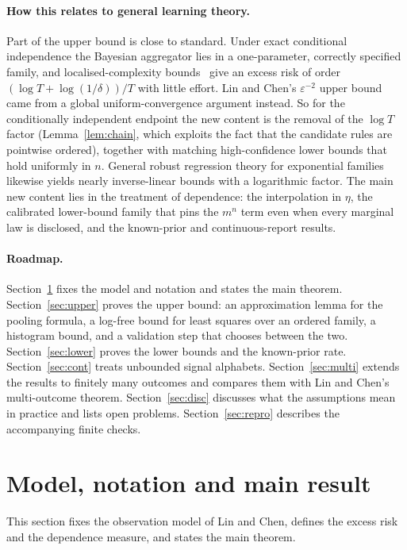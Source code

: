 \documentclass[11pt,a4paper]{article}
\theoremstyle{remark}
\newcommand{\eps}{\varepsilon}
\begin{document}
\paragraph{How this relates to general learning theory.}
Part of the upper bound is close to standard. Under exact conditional independence the Bayesian aggregator lies in a one-parameter, correctly specified family, and localised-complexity bounds~\cite{bbm,kol} give an excess risk of order $(\log T+\log(1/\delta))/T$ with little effort. Lin and Chen's $\eps^{-2}$ upper bound came from a global uniform-convergence argument instead. So for the conditionally independent endpoint the new content is the removal of the $\log T$ factor (Lemma~\ref{lem:chain}, which exploits the fact that the candidate rules are pointwise ordered), together with matching high-confidence lower bounds that hold uniformly in $n$. General robust regression theory for exponential families~\cite{baraud} likewise yields nearly inverse-linear bounds with a logarithmic factor. The main new content lies in the treatment of dependence: the interpolation in $\eta$, the calibrated lower-bound family that pins the $m^n$ term even when every marginal law is disclosed, and the known-prior and continuous-report results.

\paragraph{Roadmap.}
Section~\ref{sec:model} fixes the model and notation and states the main theorem. Section~\ref{sec:upper} proves the upper bound: an approximation lemma for the pooling formula, a log-free bound for least squares over an ordered family, a histogram bound, and a validation step that chooses between the two. Section~\ref{sec:lower} proves the lower bounds and the known-prior rate. Section~\ref{sec:cont} treats unbounded signal alphabets. Section~\ref{sec:multi} extends the results to finitely many outcomes and compares them with Lin and Chen's multi-outcome theorem. Section~\ref{sec:disc} discusses what the assumptions mean in practice and lists open problems. Section~\ref{sec:repro} describes the accompanying finite checks.

\section{Model, notation and main result}\label{sec:model}
This section fixes the observation model of Lin and Chen, defines the excess risk and the dependence measure, and states the main theorem.
\end{document}
